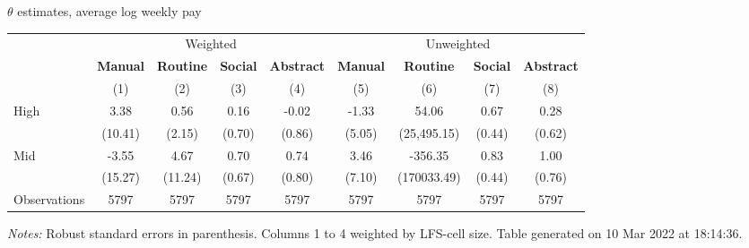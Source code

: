 \begin{center}
\begin{threeparttable}[!h]
\caption{$ \theta $ estimates, average log weekly pay}
\begin{tabular}{lcccccccc}
\toprule
\toprule
& \multicolumn{4}{c}{Weighted} & \multicolumn{4}{c}{Unweighted} \\
&\multicolumn{1}{c}{\textbf{Manual}}&\multicolumn{1}{c}{\textbf{Routine}}&\multicolumn{1}{c}{\textbf{Social}}&\multicolumn{1}{c}{\textbf{Abstract}}&\multicolumn{1}{c}{\textbf{Manual}}&\multicolumn{1}{c}{\textbf{Routine}}&\multicolumn{1}{c}{\textbf{Social}}&\multicolumn{1}{c}{\textbf{Abstract}} \\
\textbf{}&\multicolumn{1}{c}{(1)}&\multicolumn{1}{c}{(2)}&\multicolumn{1}{c}{(3)}&\multicolumn{1}{c}{(4)}&\multicolumn{1}{c}{(5)}&\multicolumn{1}{c}{(6)}&\multicolumn{1}{c}{(7)}&\multicolumn{1}{c}{(8)} \\
\midrule
High                &        3.38&        0.56&        0.16&       -0.02&       -1.33&       54.06&        0.67&        0.28\\
                    &     (10.41)&      (2.15)&      (0.70)&      (0.86)&      (5.05)& (25,495.15)&      (0.44)&      (0.62)\\
Mid                 &       -3.55&        4.67&        0.70&        0.74&        3.46&     -356.35&        0.83&        1.00\\
                    &     (15.27)&     (11.24)&      (0.67)&      (0.80)&      (7.10)& (170033.49)&      (0.44)&      (0.76)\\
Observations        &        5797&        5797&        5797&        5797&        5797&        5797&        5797&        5797\\
\bottomrule
\bottomrule
\end{tabular}
\begin{tablenotes}
\item \footnotesize \textit{Notes:} Robust standard errors in parenthesis. Columns 1 to 4 weighted by LFS-cell size. Table generated on 10 Mar 2022 at 18:14:36.
\end{tablenotes}
\end{threeparttable}
\end{center}
